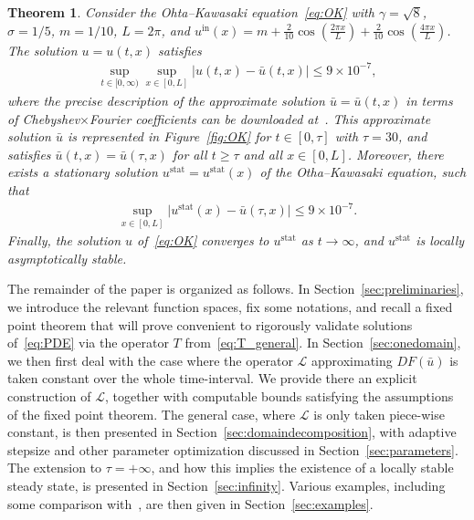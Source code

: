 \documentclass[10pt,a4paper]{article}
\theoremstyle{plain}
\newtheorem{theorem}{Theorem}[section]
\renewcommand{\L}{\mathcal{L}}
\newcommand{\bu}{\bar{u}}
\newcommand{\1}{\mathbf{1}}
\newcommand{\uin}{{u^{\mathrm{in}}}}
\newcommand{\stat}{\mathrm{stat}}
\begin{document}
\begin{theorem}
\label{th:OK}
Consider the Ohta--Kawasaki equation~\eqref{eq:OK}	
with $\gamma = \sqrt{8}$, $\sigma=1/5$, $m=1/10$, $L=2\pi$, and $\uin(x) = m+\frac{2}{10}\cos\left(\frac{2\pi x}{L}\right)+\frac{2}{10}\cos\left(\frac{4\pi x}{L}\right)$. The solution $u=u(t,x)$ satisfies
\begin{align*}
\sup_{t\in [0,\infty)} \sup_{x\in [0,L]} \vert u(t,x)-\bu(t,x) \vert \leq 9\times 10^{-7},
\end{align*}
where the precise description of the approximate solution $\bu=\bu(t,x)$ in terms of Chebyshev$\times$Fourier coefficients can be downloaded
 at~\cite{integratorcode_new}. This approximate solution $\bu$ is represented in Figure~\ref{fig:OK} for $t\in[0,\tau]$ with $\tau=30$, and satisfies $\bu(t,x) = \bu(\tau,x)$ for all $t\geq \tau$ and all $x\in[0,L]$. Moreover, there exists a stationary solution $u^\stat=u^\stat(x)$ of the Otha--Kawasaki equation, such that
\begin{align*}
\sup_{x\in [0,L]} \vert u^\stat(x)-\bu(\tau,x) \vert \leq 9\times 10^{-7}.
\end{align*}
Finally, the solution $u$ of~\eqref{eq:OK} converges to $u^\stat$ as $t\to\infty$, and $u^\stat$ is locally asymptotically stable. 
\end{theorem}


\medskip


The remainder of the paper is organized as follows. In Section~\ref{sec:preliminaries}, we introduce the relevant function spaces, fix some notations, and recall a fixed point theorem that will prove convenient to rigorously validate solutions of~\eqref{eq:PDE} via the operator $T$ from~\eqref{eq:T_general}. In Section~\ref{sec:onedomain}, we then first deal with the case where the operator $\L$ approximating $DF(\bu)$ is taken constant over the whole time-interval. We provide there an explicit construction of $\L$, together with computable bounds satisfying the assumptions of the fixed point theorem. The general case, where $\L$ is only taken piece-wise constant, is then presented in Section~\ref{sec:domaindecomposition}, with adaptive stepsize and other parameter optimization discussed in Section~\ref{sec:parameters}. The extension to $\tau=+\infty$, and how this implies the existence of a locally stable steady state, is presented in Section~\ref{sec:infinity}. Various examples, including some comparison with~\cite{BerBreShe24}, are then given in Section~\ref{sec:examples}.
\end{document}
